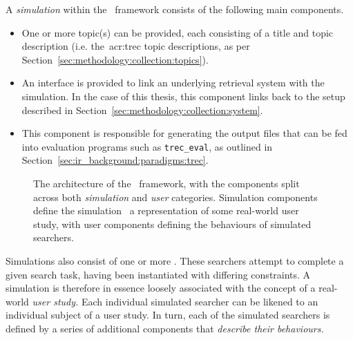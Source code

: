 A \emph{simulation} within the \simiir~framework consists of the following main components.

\begin{itemize}
    \item{ One or more topic(s) can be provided, each consisting of a title and topic description (i.e. the~\gls{acr:trec} topic descriptions, as per Section~\ref{sec:methodology:collection:topics}).}
    \item{ An interface is provided to link an underlying retrieval system with the simulation. In the case of this thesis, this component links back to the setup described in Section~\ref{sec:methodology:collection:system}.}
    \item{ This component is responsible for generating the output files that can be fed into evaluation programs such as \texttt{trec\_eval}, as outlined in Section~\ref{sec:ir_background:paradigms:trec}.}
\end{itemize}

\begin{figure}[t!]
    \centering
    \caption[Architecture of the \simiir~framework]{The architecture of the \simiir~framework, with the components split across both \emph{simulation} and \emph{user} categories. Simulation components define the simulation \textemdash~a representation of some real-world user study, with user components defining the behaviours of simulated searchers.}
    \label{fig:simiir}
\end{figure}

Simulations also consist of one or more . These searchers attempt to complete a given search task, having been instantiated with differing constraints. A simulation is therefore in essence loosely associated with the concept of a real-world \emph{user study.} Each individual simulated searcher can be likened to an individual subject of a user study. In turn, each of the simulated searchers is defined by a series of additional components that \emph{describe their behaviours.}

